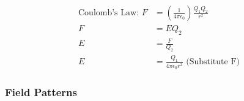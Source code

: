 \documentclass[../../../main.tex]{subfiles}
\begin{document}
\begin{align*}
    \text{Coulomb's Law: } F & =(\frac{1}{4\pi\epsilon_0})\frac{Q_1Q_2}{r^2}         \\
    F                        & =EQ_2                                                 \\
    E                        & =\frac{F}{Q_2}                                        \\
    E                        & =\frac{Q_1}{4\pi\epsilon_0r^2} \text{ (Substitute F)}
\end{align*}

\newpage

\subsubsection{Field Patterns}
\end{document}
